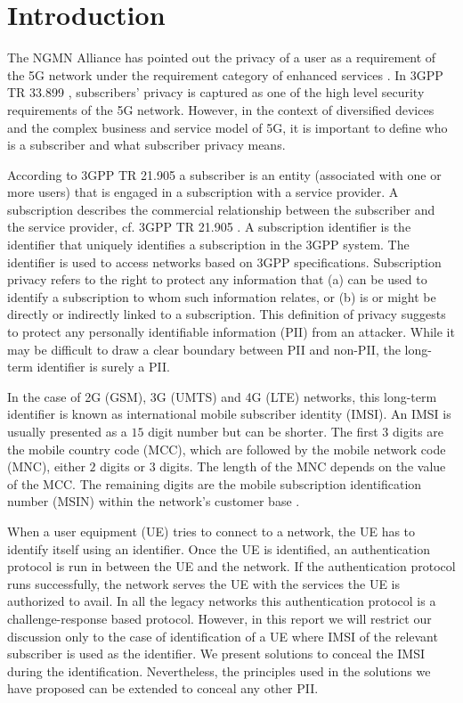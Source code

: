 \documentclass[runningheads,a4paper]{llncs} %
\begin{document}
\section{Introduction}
\label{intro} The NGMN Alliance has pointed out the privacy of a user as a requirement of the 5G network under the requirement category of enhanced services \cite{NGMN_white_paper}. In 3GPP TR 33.899 \cite{TR33899}, subscribers' privacy is captured as one of the high level security requirements of the 5G network. However, in the context of diversified devices and the complex business and service model of 5G, it is important to define who is a subscriber and what subscriber privacy means. 

According to 3GPP TR 21.905 \cite{TR21905} a subscriber is an entity (associated with one or more users) that is engaged in a subscription with a service provider. A subscription describes the commercial relationship between the subscriber and the service provider, cf. 3GPP TR 21.905 \cite{TR21905}. A subscription identifier is the identifier that uniquely identifies a subscription in the 3GPP system. The identifier is used to access networks based on 3GPP specifications. Subscription privacy refers to the right to protect any information that (a) can be used to identify a subscription to whom such information relates, or (b) is or might be directly or indirectly linked to a subscription. This definition of privacy suggests to protect any personally identifiable information (PII) from an attacker. While it may be difficult to draw a clear boundary between PII and non-PII, the long-term identifier is surely a PII. 

In the case of 2G (GSM), 3G (UMTS) and 4G (LTE) networks, this long-term identifier is known as international mobile subscriber identity (IMSI). An IMSI is usually presented as a $15$ digit number but can be shorter. The first $3$ digits are the mobile country code (MCC), which are followed by the mobile network code (MNC), either $2$ digits or $3$ digits. The length of the MNC depends on the value of the MCC. The remaining digits are the mobile subscription identification number (MSIN) within the network's customer base \cite{TS23003}. 

When a user equipment (UE) tries to connect to a network, the UE has to identify itself using an identifier. Once the UE is identified, an authentication protocol is run in between the UE and the network. If the authentication protocol runs successfully, the network serves the UE with the services the UE is authorized to avail. In all the legacy networks this authentication protocol is a challenge-response based protocol. However, in this report we will restrict our discussion only to the case of identification of a UE where IMSI of the relevant subscriber is used as the identifier. We present solutions to conceal the IMSI during the identification. Nevertheless, the principles used in the solutions we have proposed can be extended to conceal any other PII. 
\end{document}

